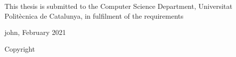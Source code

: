 \begin{dedication}



This thesis is submitted to the Computer Science Department, Universitat Polit\`ecnica de Catalunya, in fulfilment of the requirements  



\begin{center}
    

john, February 2021
\end{center}

\begin{center}
    

\vspace*{\fill}%

Copyright \textcopyright {} \\

\end{center}








\end{dedication}



